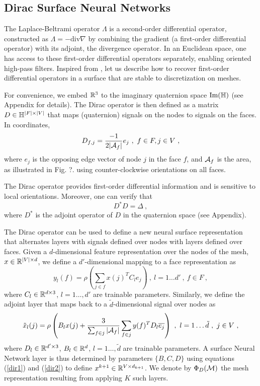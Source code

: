 \subsection{Dirac Surface Neural Networks}

The Laplace-Beltrami operator $\Lambda$ is a second-order differential operator, 
constructed as $\Lambda = -\text{div} \nabla$ by combining the gradient (a first-order differential 
operator) with its adjoint, the divergence operator. In an Euclidean space, one has access to 
these first-order differential operators separately, enabling oriented high-pass filters. 
Inspired from \cite{diracpaper}, let us describe how to recover first-order differential operators in a surface that are 
stable to discretization on meshes. 

For convenience, we embed ${\mathbb{R}}^3$ to the imaginary quaternion space $\text{Im}({\mathbb{H}})$ (see Appendix for details). 
The Dirac operator is then defined as a matrix $D  \in {\mathbb{H}}^{|F| \times |V|}$ that maps (quaternion) signals on the nodes to signals on the faces. 
In coordinates, 
$$D_{f,j} = \frac{-1}{2 | {\mathcal A}_f | }e_j~,~f \in F, j \in V~,$$
where $e_j$ is the opposing edge vector of node $j$ in the face $f$, and ${\mathcal A}_f$ is 
the area, as illustrated in Fig. ?.
using counter-clockwise orientations on all faces. 

The Dirac operator provides first-order differential information 
and is sensitive to local orientations. 
Moreover, one can verify \cite{diracpaper} that 
$$D^* D  = \Delta  ~,$$
where $D^*$ is the adjoint operator of $D$ in the quaternion space (see Appendix). 

The Dirac operator can be used to define a new neural surface representation 
that alternates layers with signals defined over nodes with layers defined over faces. 
Given a $d$-dimensional feature representation over the nodes of the mesh, $x \in {\mathbb{R}}^{|V| \times d}$, 
we define a $d'$-dimensional mapping to a face representation as 
\begin{equation}
\label{dir1}
y_l(f) =  \rho \left(\sum_{j \in f} x(j)^T C_l  e_j \right)~,~l=1\dots d'~,~f \in F~,
\end{equation}
where $C_l \in {\mathbb{R}}^{d \times 3}$, $l =1 \dots, d'$ are trainable parameters.
Similarly, we define the adjoint layer that maps back to a $\tilde{d}$-dimensional signal over nodes as
\begin{equation}
\label{dir2}
\tilde{x}_l(j) = \rho \left(B_l x(j) + \frac{3}{\sum_{f \in j} |{\mathcal A}_f| }  \sum_{f \in j} y(f)^T D_l  \overline{e_j} \right)~,~l=1\dots \tilde{d}~,~j \in V~,
\end{equation}
where $D_l \in {\mathbb{R}}^{d' \times 3}$, $B_l \in {\mathbb{R}}^d$, $l =1 \dots, \tilde{d}$ are trainable parameters.
A surface Neural Network layer is thus determined by parameters $\{B, C, D\}$ using equations (\ref{dir1}) and (\ref{dir2}) 
to define $x^{k+1} \in {\mathbb{R}}^{V \times d_{k+1}}$.  We denote by $\Phi_D({\mathcal{M}})$ the mesh representation resulting 
from applying $K$ such layers.


